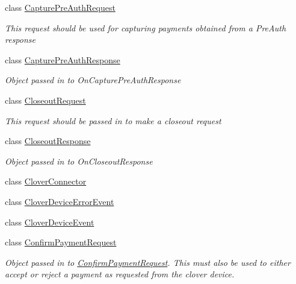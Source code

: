 \begin{DoxyCompactItemize}
\item 
class \hyperlink{classcom_1_1clover_1_1remotepay_1_1sdk_1_1_capture_pre_auth_request}{Capture\+Pre\+Auth\+Request}
\begin{DoxyCompactList}\small\item\em This request should be used for capturing payments obtained from a Pre\+Auth response \end{DoxyCompactList}\item 
class \hyperlink{classcom_1_1clover_1_1remotepay_1_1sdk_1_1_capture_pre_auth_response}{Capture\+Pre\+Auth\+Response}
\begin{DoxyCompactList}\small\item\em Object passed in to On\+Capture\+Pre\+Auth\+Response \end{DoxyCompactList}\item 
class \hyperlink{classcom_1_1clover_1_1remotepay_1_1sdk_1_1_closeout_request}{Closeout\+Request}
\begin{DoxyCompactList}\small\item\em This request should be passed in to make a closeout request \end{DoxyCompactList}\item 
class \hyperlink{classcom_1_1clover_1_1remotepay_1_1sdk_1_1_closeout_response}{Closeout\+Response}
\begin{DoxyCompactList}\small\item\em Object passed in to On\+Closeout\+Response \end{DoxyCompactList}\item 
class \hyperlink{classcom_1_1clover_1_1remotepay_1_1sdk_1_1_clover_connector}{Clover\+Connector}
\item 
class \hyperlink{classcom_1_1clover_1_1remotepay_1_1sdk_1_1_clover_device_error_event}{Clover\+Device\+Error\+Event}
\item 
class \hyperlink{classcom_1_1clover_1_1remotepay_1_1sdk_1_1_clover_device_event}{Clover\+Device\+Event}
\item 
class \hyperlink{classcom_1_1clover_1_1remotepay_1_1sdk_1_1_confirm_payment_request}{Confirm\+Payment\+Request}
\begin{DoxyCompactList}\small\item\em Object passed in to \hyperlink{classcom_1_1clover_1_1remotepay_1_1sdk_1_1_confirm_payment_request}{Confirm\+Payment\+Request}. This must also be used to either accept or reject a payment as requested from the clover device. \end{DoxyCompactList}\item 

\end{DoxyCompactItemize}
